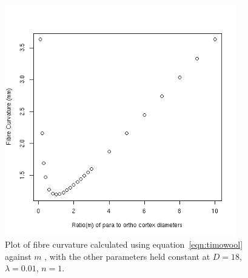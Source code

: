%

\begin{figure}[!h]
  \centering
  \includegraphics[width=0.9\textwidth]{curvm.png}
  \caption{Plot of fibre curvature calculated using equation~\ref{eqn:timowool} against $m$ , with the other parameters held constant at $D = 18$, $\lambda=0.01$, $n=1$.}
  \label{fig:curvm}
\end{figure}

%

